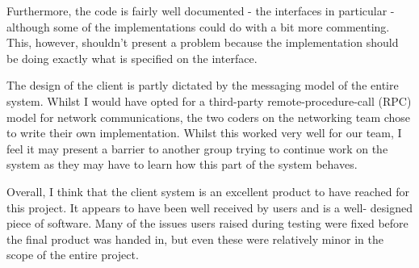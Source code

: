 Furthermore, the code is fairly well documented - the interfaces in particular
- although some of the implementations could do with a bit more commenting. 
This, however, shouldn't present a problem because the implementation should be
doing exactly what is specified on the interface.

The design of the client is partly dictated by the messaging model of the
entire system. Whilst I would have opted for a third-party remote-procedure-call
(RPC) model for network communications, the two coders on the networking team
chose to write their own implementation. Whilst this worked very well for our
team, I feel it may present a barrier to another group trying to continue work
on the system as they may have to learn how this part of the system behaves.

Overall, I think that the client system is an excellent product to have reached
for this project. It appears to have been well received by users and is a well-
designed piece of software. Many of the issues users raised during testing were
fixed before the final product was handed in, but even these were relatively
minor in the scope of the entire project.
